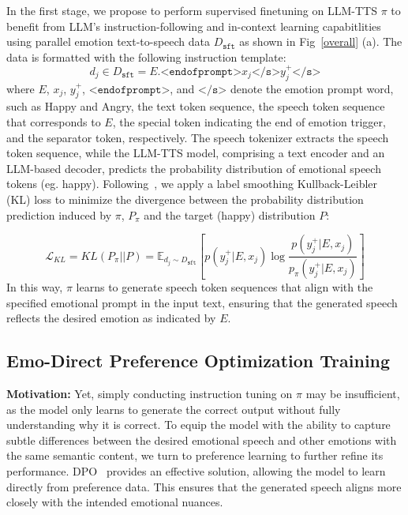 In the first stage, we propose to perform supervised finetuning on LLM-TTS $\pi$ to benefit from LLM's instruction-following and in-context learning capabitlities using parallel emotion text-to-speech data $D_\texttt{sft}$ as shown in Fig~\ref{overall} (a). The data is formatted with the following instruction template: 
\[
d_j \in D_\texttt{sft} = E. \texttt{<endofprompt>} x_j \texttt{</s>} y_j^{+} \texttt{</s>}
\]
where $E$, $x_j$, $y_j^{+}$, $\texttt{<endofprompt>}$, and $\texttt{</s>}$ denote the emotion prompt word, such as Happy and Angry, the text token sequence, the speech token sequence that corresponds to $E$, the special token indicating the end of emotion trigger, and the separator token, respectively. The speech tokenizer extracts the speech token sequence, while the LLM-TTS model, comprising a text encoder and an LLM-based decoder, predicts the probability distribution of emotional speech tokens (eg. happy). Following~\cite{du2024cosyvoice}, we apply a label smoothing Kullback-Leibler (KL) loss to minimize the divergence between the probability distribution prediction induced by $\pi$, $P_{\pi}$ and the target (happy) distribution $P$:

\small
\[
\mathcal{L}_{KL} = KL(P_{\pi}||P) = \mathbb{E}_{d_j\sim D_\texttt{sft}} \left[ p(y^+_j | E, x_j) \log \frac{p(y^+_j | E, x_j)}{p_{\pi}(y^+_j | E, x_j)} \right]
\]
\normalsize
In this way, $\pi$ learns to generate speech token sequences that align with the specified emotional prompt in the input text, ensuring that the generated speech reflects the desired emotion as indicated by $E$.
\vspace{-0.1cm}
\subsection{Emo-Direct Preference Optimization Training}
\vspace{-0.1cm}
\textbf{Motivation:} Yet, simply conducting instruction tuning on $\pi$ may be insufficient, as the model only learns to generate the correct output without fully understanding why it is correct. To equip the model with the ability to capture subtle differences between the desired emotional speech and other emotions with the same semantic content, we turn to preference learning to further refine its performance. DPO~\cite{rafailov2023direct} provides an effective solution, allowing the model to learn directly from preference data. This ensures that the generated speech aligns more closely with the intended emotional nuances. 

